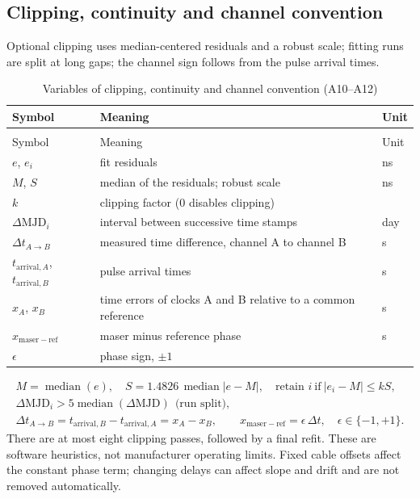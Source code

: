 \documentclass[11pt,a4paper]{article}
\makeatletter
\renewcommand{\_}{\usscore\allowbreak}
\newenvironment{vartable}[2]{%
 \par\small\setlength{\LTpre}{3pt}\setlength{\LTpost}{3pt}%
 \begin{longtable}{@{}>{\raggedright}p{.2\linewidth}>{\raggedright}p{.57\linewidth}>{\raggedright\arraybackslash}p{.17\linewidth}@{}}
 \caption{#2}\label{#1}\\
 \toprule Symbol & Meaning & Unit\\\midrule
 \endfirsthead
 \multicolumn{3}{@{}l}{\footnotesize\itshape Table \thetable{} (continued)}\\
 \toprule Symbol & Meaning & Unit\\\midrule
 \endhead
 \bottomrule
 \endlastfoot}
 {\end{longtable}\normalsize}
\makeatother
\begin{document}
\subsection{Clipping, continuity and channel convention}
Optional clipping uses median-centered residuals and a robust scale; fitting runs are split at long
gaps; the channel sign follows from the pulse arrival times.
\begin{vartable}{tab:var-A2}{Variables of clipping, continuity and channel convention (A10--A12)}
\(e\), \(e_i\) & fit residuals & ns\\
\(M\), \(S\) & median of the residuals; robust scale & ns\\
\(k\) & clipping factor (0 disables clipping) & 1\\
\(\Delta\mathrm{MJD}_i\) & interval between successive time stamps & day\\
\(\Delta t_{A\rightarrow B}\) & measured time difference, channel A to channel B & s\\
\(t_{\mathrm{arrival},A}\), \(t_{\mathrm{arrival},B}\) & pulse arrival times & s\\
\(x_A\), \(x_B\) & time errors of clocks A and B relative to a common reference & s\\
\(x_{\mathrm{maser-ref}}\) & maser minus reference phase & s\\
\(\epsilon\) & phase sign, \(\pm1\) & 1\\
\end{vartable}
\begin{gather}
M=\operatorname{median}(e),\quad
S=1.4826\,\operatorname{median}|e-M|,\quad
\text{retain }i\ \text{if}\ |e_i-M|\le kS, \tag{A10}\label{eq:A10}\\
\Delta\mathrm{MJD}_i>5\operatorname{median}(\Delta\mathrm{MJD})\ \ \text{(run split)}, \tag{A11}\label{eq:A11}\\
\Delta t_{A\rightarrow B}=t_{\mathrm{arrival},B}-t_{\mathrm{arrival},A}
=x_A-x_B,\qquad x_{\mathrm{maser-ref}}=\epsilon\,\Delta t,\quad
\epsilon\in\{-1,+1\}. \tag{A12}\label{eq:A12}
\end{gather}
There are at most eight clipping passes, followed by a final refit. These are software heuristics,
not manufacturer operating limits. Fixed cable offsets affect the constant phase term; changing
delays can affect slope and drift and are not removed automatically.
\end{document}
